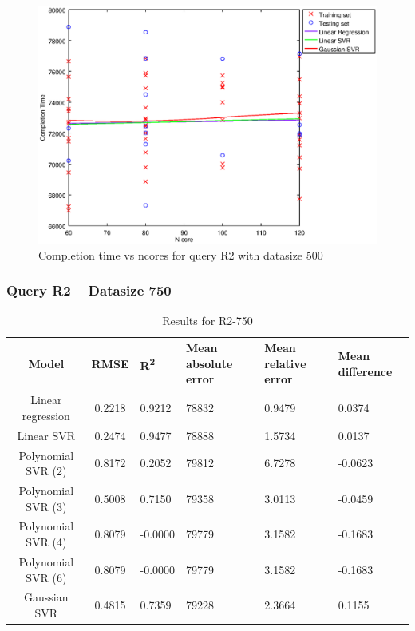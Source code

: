 \documentclass[a4paper,11pt]{article}
\begin{document}
\begin {figure}[hbtp]
\centering
\includegraphics[width=\textwidth]{output/R2_500_LINEAR_NCORE/plot_R2_500_bestmodels.eps}
\caption{Completion time vs ncores for query R2 with datasize 500}
\label{fig:all_linear_R2_500}
\end {figure}

\newpage
\subsubsection{Query R2 -- Datasize 750}
\begin{table}[H]
	\centering
	\begin{adjustbox}{center}
		\begin{tabular}{c | c M{1.2cm} M{2.5cm} M{2.5cm} M{1.8cm}}
			Model & RMSE & R\textsuperscript{2} & Mean absolute error & Mean relative error & Mean difference \tabularnewline
			\hline
			Linear regression & 0.2218 & 0.9212 &  78832 & 0.9479 & 0.0374 \\
			Linear SVR & 0.2474 & 0.9477 &  78888 & 1.5734 & 0.0137 \\
			Polynomial SVR (2) & 0.8172 & 0.2052 &  79812 & 6.7278 & -0.0623 \\
			Polynomial SVR (3) & 0.5008 & 0.7150 &  79358 & 3.0113 & -0.0459 \\
			Polynomial SVR (4) & 0.8079 & -0.0000 &  79779 & 3.1582 & -0.1683 \\
			Polynomial SVR (6) & 0.8079 & -0.0000 &  79779 & 3.1582 & -0.1683 \\
			Gaussian SVR & 0.4815 & 0.7359 &  79228 & 2.3664 & 0.1155 \\
		\end{tabular}
	\end{adjustbox}
	\\
	\caption{Results for R2-750}
	\label{fig:all_linear_R2_750}
\end{table}
\end{document}
